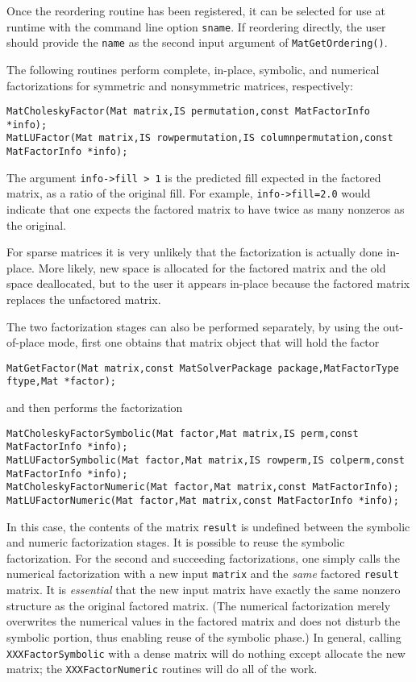 {{Once the reordering routine has been registered,
it can be selected for use at runtime with the
command line option  \lstinline{sname}.  If reordering directly,
the user should provide the \lstinline{name} as the second input argument of
\lstinline{MatGetOrdering()}.

The following routines perform complete, in-place, symbolic, and numerical
factorizations for symmetric and nonsymmetric matrices, respectively:
\begin{lstlisting}
MatCholeskyFactor(Mat matrix,IS permutation,const MatFactorInfo *info);
MatLUFactor(Mat matrix,IS rowpermutation,IS columnpermutation,const MatFactorInfo *info);
\end{lstlisting}
The argument \lstinline{info->fill > 1} is the predicted fill
expected in the factored matrix, as a ratio of the original fill.
For example, \lstinline{info->fill=2.0} would indicate that one expects the factored
matrix to have twice as many nonzeros as the original.

For sparse matrices it is very unlikely that the factorization
is actually done in-place. More likely, new space is allocated
for the factored matrix and the old space deallocated, but to the
user it appears in-place because the factored matrix replaces
the unfactored matrix.

The 
two
factorization
stages
can also be performed separately, by using the out-of-place mode, first
one obtains that matrix object that will hold the factor
\begin{lstlisting}
MatGetFactor(Mat matrix,const MatSolverPackage package,MatFactorType ftype,Mat *factor);
\end{lstlisting}
and then performs the factorization
\begin{lstlisting}
MatCholeskyFactorSymbolic(Mat factor,Mat matrix,IS perm,const MatFactorInfo *info);
MatLUFactorSymbolic(Mat factor,Mat matrix,IS rowperm,IS colperm,const MatFactorInfo *info);
MatCholeskyFactorNumeric(Mat factor,Mat matrix,const MatFactorInfo);
MatLUFactorNumeric(Mat factor,Mat matrix,const MatFactorInfo *info);
\end{lstlisting}
In this case, the contents of the matrix \lstinline{result} is undefined between
the symbolic and numeric factorization stages.
It is possible to reuse the symbolic factorization. For the second and
succeeding factorizations, one simply calls the numerical factorization with a
new input \lstinline{matrix} and the {\em same} factored \lstinline{result} matrix.
It is {\em essential} that the new input matrix
have   %
exactly the same nonzero structure as the original factored matrix.
(The numerical factorization merely overwrites the numerical values in the
factored matrix and does not disturb the symbolic portion, thus enabling
reuse of the symbolic phase.)
In general, calling \lstinline{XXXFactorSymbolic} with a dense matrix will
do nothing except allocate the new matrix; the \lstinline{XXXFactorNumeric}
routines will do all of the work.

}}
